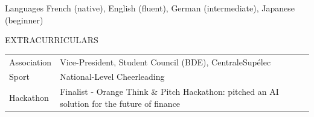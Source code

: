 \documentclass{resume}
\begin{document}
\begin{rSection}{Languages}\vspace{-0.3em}
French (native), English (fluent), German (intermediate), Japanese (beginner)
\vspace{-0.6em}
\end{rSection}

\begin{rSection}{EXTRACURRICULARS}\vspace{-0.3em}

\begin{tabularx}{\linewidth}{@{} l X }
Association & Vice-President, Student Council (BDE), CentraleSupélec \\
Sport & National-Level Cheerleading \\
Hackathon & Finalist - Orange Think \& Pitch Hackathon: pitched an AI solution for the future of finance \\
\end{tabularx}


\end{rSection}
\end{document}
